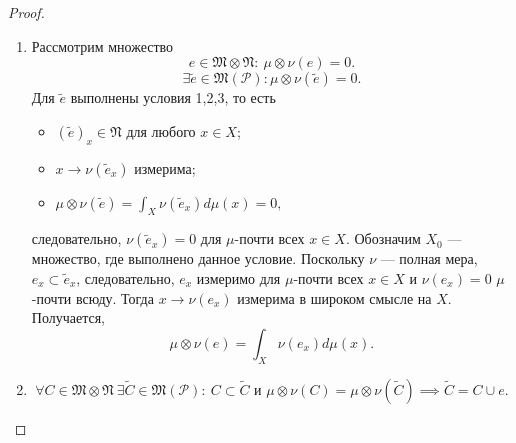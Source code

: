 \begin{proof}
\begin{enumerate}
        Теперь покажем, что
        \[\mu \otimes \nu(C) = \int_X \nu(C_x) d\mu(x) \tab \forall C \in \mathfrak{M}(\mathcal{P}).\]
        Рассмотрим меру $\Phi$ на $\mathfrak{M}(\mathcal{P})$:
        \[\underbrace{E}_{\in \mathfrak{M}(\mathcal{P})} \xrightarrow{\Phi} \int_X \nu(E_x)d\mu(x).\]
        Покажем, что $\Phi$ — это мера.
        \begin{multline*}
            \Phi \left(\bigsqcup\limits_{n=1}^{\infty}E_n\right)
            =
            \int_X \nu \left(\left(\bigsqcup\limits_{n=1}^{\infty}E_n\right)_x\right) d\mu(x)
            =
            \int_X \sum\limits_{n=1}^{\infty} \nu((E_n)_x) d\mu(x)
            =\\=
            \text{(по теореме Беппо Леви)}
            =
            \sum\limits_{n=1}^{\infty} \int_X \nu((E_n)_x) d\mu(x)
            =
            \sum\limits_{n=1}^{\infty}\Phi(E_n) \implies
        \end{multline*} 
        $\Phi$ — мера на $\mathfrak{M} \otimes \mathfrak{N}$.
        Но $\Phi|_\mathcal{P} = \mu \otimes \nu|_\mathcal{P}$, следовательно, $\Phi = \mu \otimes \nu$ на $\mathfrak{M}(\mathcal{P})$ по теореме о единственности продолжения меры.
        \item Рассмотрим множество 
        $$e \in \mathfrak{M} \otimes \mathfrak{N}: \ \mu \otimes \nu(e) = 0.$$
        \[\exists \widetilde{e} \in \mathfrak{M}(\mathcal{P}): \mu \otimes \nu(\widetilde{e}) = 0.\]
        Для $\widetilde{e}$ выполнены условия 1,2,3, то есть
        \begin{itemize}
            \item $(\widetilde{e})_x \in \mathfrak{N}$ для любого $x \in X$;
            \item $x \to \nu(\widetilde{e}_x)$ измерима;
            \item $\mu \otimes \nu(\widetilde{e}) = \int_X \nu(\widetilde{e}_x)d\mu(x) = 0,$ 
        \end{itemize}
        следовательно, $\nu(\widetilde{e}_x) = 0$ для $\mu$-почти всех $x \in X$. Обозначим $X_0$ — множество, где выполнено данное условие.
        Поскольку $\nu$ — полная мера, $e_x \subset \widetilde{e}_x$, следовательно, $e_x$ измеримо для $\mu$-почти всех $x \in X$ и $\nu(e_x) = 0$ $\mu$-почти всюду.
        Тогда $x \to \nu(e_x)$ измерима в широком смысле на $X$.
        Получается,
        \[\mu \otimes \nu(e) = \int_X \nu(e_x) d\mu(x).\]
        \item
        \[\forall C \in \mathfrak{M} \otimes \mathfrak{N} \ \exists \widetilde{C} \in \mathfrak{M}(\mathcal{P}): \ C \subset \widetilde{C} \text{ и } \mu \otimes \nu(C) = \mu \otimes \nu(\widetilde{C}) \implies \widetilde{C} = C \cup e.\]

\end{enumerate}
\end{proof}
